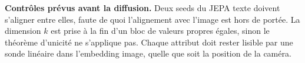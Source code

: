 \documentclass[10pt,a4paper]{article}
\begin{document}
\textbf{Contrôles prévus avant la diffusion.} Deux seeds du JEPA texte doivent s'aligner entre elles, faute de quoi l'alignement avec l'image est hors de portée. La dimension $k$ est prise à la fin d'un bloc de valeurs propres égales, sinon le théorème d'unicité ne s'applique pas. Chaque attribut doit rester lisible par une sonde linéaire dans l'embedding image, quelle que soit la position de la caméra.
\end{document}
